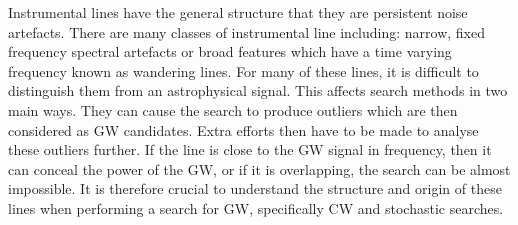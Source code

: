 %

Instrumental lines have the general structure that they are persistent noise artefacts.
There are many classes of instrumental line including: narrow, fixed frequency spectral artefacts or broad features which have a time varying frequency known as wandering lines.
For many of these lines, it is difficult to distinguish them from an astrophysical signal.
This affects search methods in two main ways. 
They can cause the search to produce outliers which are then considered as \ac{GW} candidates.
Extra efforts then have to be made to analyse these outliers further.
If the line is close to the \ac{GW} signal in frequency, then it can conceal the power of the \ac{GW}, or if it is overlapping, the search can be almost impossible.
It is therefore crucial to understand the structure and origin of these lines when performing a search for \ac{GW}, specifically \ac{CW} and stochastic searches.

%


